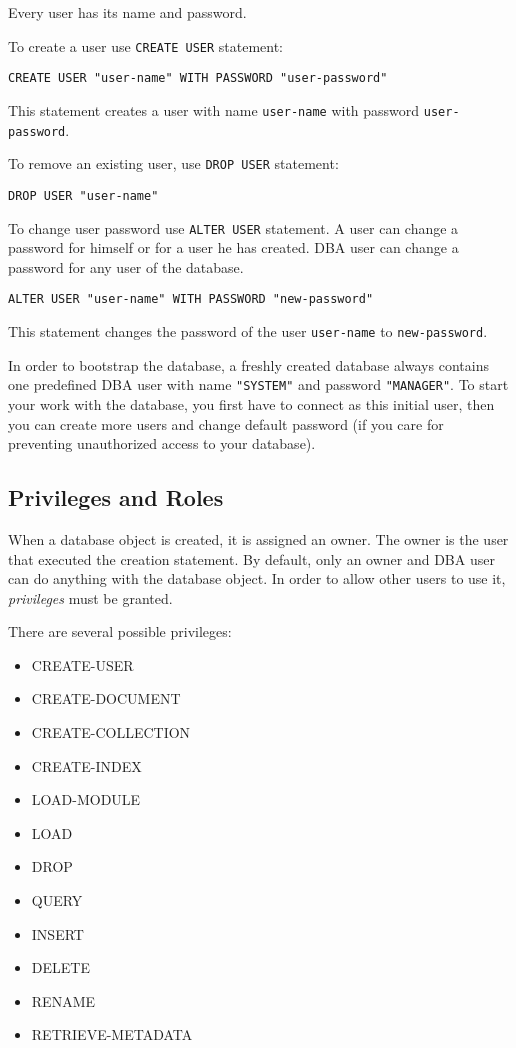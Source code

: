 \documentclass[a4paper,12pt]{article}
\begin{document}
Every user has its name and password.

To create a user use \verb!CREATE USER! statement:

\begin{verbatim}
CREATE USER "user-name" WITH PASSWORD "user-password"
\end{verbatim}

This statement creates a user with name \verb!user-name! with password \verb!user-password!.

To remove an existing user, use \verb!DROP USER! statement:

\begin{verbatim}
DROP USER "user-name"
\end{verbatim}

To change user password use \verb!ALTER USER! statement. A user can change a password for himself or for a user he has created. DBA user can change a password for any user of the database.

\begin{verbatim}
ALTER USER "user-name" WITH PASSWORD "new-password"
\end{verbatim}

This statement changes the password of the user \verb!user-name! to \verb!new-password!.

In order to bootstrap the database, a freshly created database always contains one predefined DBA user with name \verb!"SYSTEM"! and password \verb!"MANAGER"!. To start your work with the database, you first have to connect as this initial user, then you can create more users and change default password (if you care for preventing unauthorized access to your database).

\subsection{Privileges and Roles}
\label{roles}

When a database object is created, it is assigned an owner. The owner is the user that executed the creation statement. By default, only an owner and DBA user can do anything with the database object. In order to allow other users to use it, \emph{privileges} must be granted.

There are several possible privileges:
\begin{itemize}
\item CREATE-USER
\item CREATE-DOCUMENT
\item CREATE-COLLECTION
\item CREATE-INDEX
\item LOAD-MODULE
\item LOAD
\item DROP
\item QUERY
\item INSERT
\item DELETE
\item RENAME
\item RETRIEVE-METADATA
\end{itemize}
\end{document}
